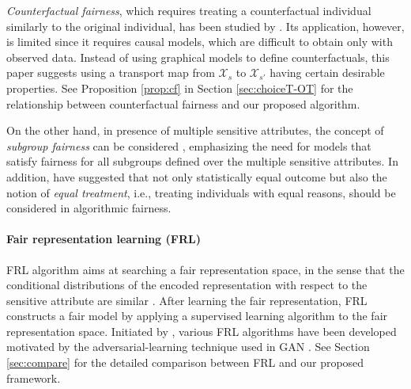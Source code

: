 \documentclass[10pt]{article} %
\begin{document}
\textit{Counterfactual fairness}, which requires treating a counterfactual individual similarly to the original individual, has been studied by \citet{https://doi.org/10.48550/arxiv.1703.06856, https://doi.org/10.48550/arxiv.1802.08139, Kugelgen20, pmlr-v162-nilforoshan22a}.
Its application, however, is limited since it requires causal models, which are difficult to obtain only with observed data.
Instead of using graphical models to define counterfactuals, this paper suggests using a transport map from $\mathcal{X}_s$ to $\mathcal{X}_{s'}$ having certain desirable properties.
See Proposition \ref{prop:cf} in Section \ref{sec:choiceT-OT} for the relationship between counterfactual fairness and our proposed algorithm.

On the other hand, in presence of multiple sensitive attributes, the concept of \textit{subgroup fairness} can be considered \citep{kearns2018empirical, pmlr-v80-kearns18a, shui2022on, 10.1145/3531146.3533124, molina2022bounding, carvalho2022affirmative}, emphasizing the need for models that satisfy fairness for all subgroups defined over the multiple sensitive attributes. 
In addition, \citet{wachter2020bias, 10.1145/3461702.3462556, mougan2024beyond} have suggested that not only statistically equal outcome but also the notion of \textit{equal treatment}, i.e., treating individuals with equal reasons, should be considered in algorithmic fairness.



\paragraph{Fair representation learning (FRL)}

FRL algorithm aims at searching a fair representation space, in the sense that the conditional distributions of the encoded representation with respect to the sensitive attribute are similar \citep{pmlr-v28-zemel13}.
After learning the fair representation, FRL constructs a fair model by applying a supervised learning algorithm to the fair representation space.
Initiated by \citet{9aa5ba8a091248d597ff7cf0173da151}, various FRL algorithms have been developed \citep{Madras2018LearningAF, 10.1145/3278721.3278779} motivated by the adversarial-learning technique used in GAN \citep{NIPS2014_5ca3e9b1}.
See Section \ref{sec:compare} for the detailed comparison between FRL and our proposed framework.
\end{document}
